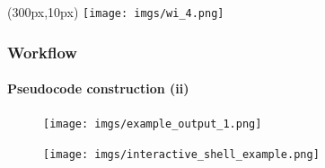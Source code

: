 \documentclass{beamer}
\begin{document}

\begin{frame}
\begin{textblock*}{5cm}(300px,10px) %
	\texttt{[image: imgs/wi\_4.png]}
\end{textblock*}
\frametitle{Workflow}
\framesubtitle{Pseudocode construction (ii)}
\begin{figure}
	\texttt{[image: imgs/example\_output\_1.png]}
\end{figure}
\pause
\begin{figure}
	\texttt{[image: imgs/interactive\_shell\_example.png]}
\end{figure}
\end{frame}
\end{document}
